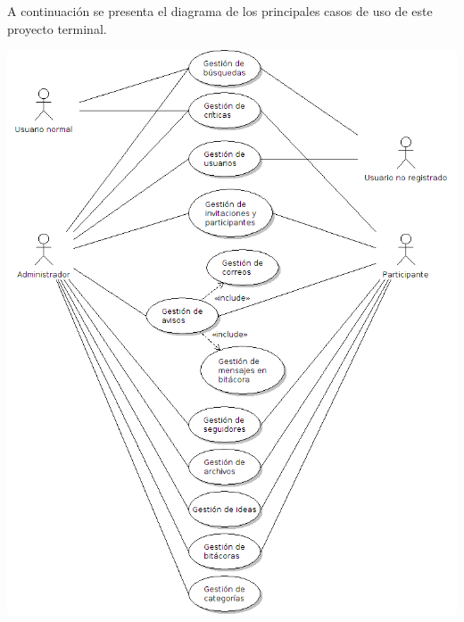 \documentclass[11pt,letterpaper,titlepage]{article}
\begin{document}
A continuaci\'on se presenta el diagrama de los principales casos de uso de este proyecto terminal.
\begin{center}
\includegraphics[width=390pt]{casos1.png}
\end{center}
\end{document}
